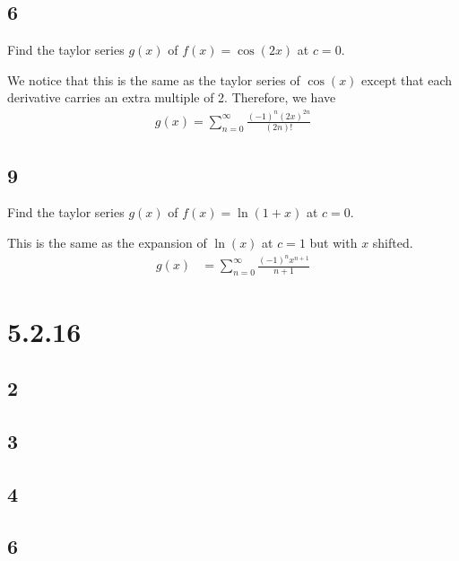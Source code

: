 \documentclass[12pt]{article}
\begin{document}
\subsection*{6}
Find the taylor series $g(x)$ of $f(x) = \cos(2x)$ at $c=0$.

We notice that this is the same as the taylor series of $\cos(x)$ except that each derivative carries an extra multiple of 2. Therefore, we have
\begin{align*}
    g(x) = \sum_{n=0}^\infty \frac{(-1)^n (2x)^{2n}}{(2n)!}
\end{align*}

\subsection*{9}
Find the taylor series $g(x)$ of $f(x) = \ln(1+x)$ at $c=0$.

This is the same as the expansion of $\ln(x)$ at $c=1$ but with $x$ shifted.
\begin{align*}
    g(x) &= \sum_{n=0}^\infty \frac{(-1)^n x^{n+1}}{n+1}
\end{align*}



\section*{5.2.16}
\subsection*{2}
\subsection*{3}
\subsection*{4}
\subsection*{6}
\end{document}
